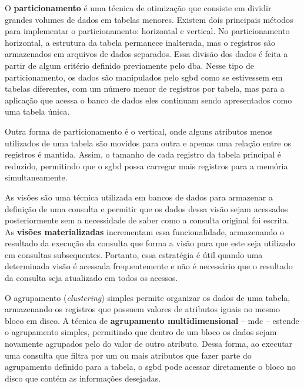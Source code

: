 O \textbf{particionamento} é uma técnica de otimização que consiste em dividir grandes volumes de dados em tabelas menores. Existem dois principais métodos para implementar o particionamento: horizontal e vertical. No particionamento horizontal, a estrutura da tabela permanece inalterada, mas o registros são armazenados em arquivos de dados separados. Essa divisão dos dados é feita a partir de algum critério definido previamente pelo \gls{dba}. Nesse tipo de particionamento, os dados são manipulados pelo \gls{sgbd} como se estivessem em tabelas diferentes, com um número menor de registros por tabela, mas para a aplicação que acessa o banco de dados eles continuam sendo apresentados como uma tabela única.

Outra forma de particionamento é o vertical, onde alguns atributos menos utilizados de uma tabela são movidos para outra e apenas uma relação entre os registros é mantida. Assim, o tamanho de cada registro da tabela principal é reduzido, permitindo que o \gls{sgbd} possa carregar mais registros para a memória simultaneamente.

As visões são uma técnica utilizada em bancos de dados para armazenar a definição de uma consulta e permitir que os dados dessa visão sejam acessados posteriormente sem a necessidade de saber como a consulta original foi escrita. As \textbf{visões materializadas} incrementam essa funcionalidade, armazenando o resultado da execução da consulta que forma a visão para que este seja utilizado em consultas subsequentes. Portanto, essa estratégia é útil quando uma determinada visão é acessada frequentemente e não é necessário que o resultado da consulta seja atualizado em todos os acessos.

O agrupamento (\emph{clustering}) simples permite organizar os dados de uma tabela, armazenando os registros que possuem valores de atributos iguais no mesmo bloco em disco. A técnica de \textbf{agrupamento multidimensional} -- \gls{mdc} -- estende o agrupamento simples, permitindo que dentro de um bloco os dados sejam novamente agrupados pelo do valor de outro atributo. Dessa forma, ao executar uma consulta que filtra por um ou mais atributos que fazer parte do agrupamento definido para a tabela, o \gls{sgbd} pode acessar diretamente o bloco no disco que contém as informações desejadas.
